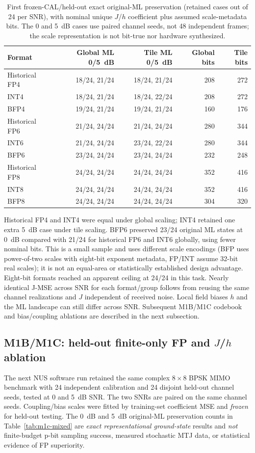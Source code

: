 \documentclass[11pt,a4paper]{article}
\begin{document}
\begin{table}[htbp]
\centering\small
\begin{tabular}{@{}lrrrr@{}}\toprule
Format & Global ML 0/5~dB & Tile ML 0/5~dB & Global bits & Tile bits\\\midrule
Historical FP4 & 18/24, 21/24 & 18/24, 21/24 & 208 & 272\\
INT4 & 18/24, 21/24 & 18/24, 22/24 & 208 & 272\\
BFP4 & 19/24, 21/24 & 19/24, 21/24 & 160 & 176\\
Historical FP6 & 21/24, 24/24 & 21/24, 24/24 & 280 & 344\\
INT6 & 21/24, 24/24 & 23/24, 22/24 & 280 & 344\\
BFP6 & 23/24, 24/24 & 23/24, 24/24 & 232 & 248\\
Historical FP8 & 24/24, 24/24 & 24/24, 24/24 & 352 & 416\\
INT8 & 24/24, 24/24 & 24/24, 24/24 & 352 & 416\\
BFP8 & 24/24, 24/24 & 24/24, 24/24 & 304 & 320\\\bottomrule
\end{tabular}
\caption{First frozen-CAL/held-out exact original-ML preservation
(retained cases out of 24 per SNR), with nominal unique $J$/$h$
coefficient plus assumed scale-metadata bits. The 0 and 5~dB
cases use paired channel seeds, not 48 independent frames; the
scale representation is not bit-true nor hardware synthesized.}
\label{tab:m1b-heldout}
\end{table}

Historical FP4 and INT4 were equal under global scaling; INT4
retained one extra 5~dB case under tile scaling. BFP6 preserved
23/24 original ML states at 0~dB compared with 21/24 for
historical FP6 and INT6 globally, using fewer nominal bits.
This is a small sample and uses different scale encodings
(BFP uses power-of-two scales with eight-bit exponent metadata,
FP/INT assume 32-bit real scales); it is not an equal-area or
statistically established design advantage. Eight-bit formats
reached an apparent ceiling at 24/24 in this task.
Nearly identical J-MSE across SNR for each format/group follows
from reusing the same channel realizations and $J$ independent
of received noise. Local field biases $h$ and the ML landscape
can still differ across SNR. Subsequent M1B/M1C codebook
and bias/coupling ablations are described in the next subsection.
\subsection{M1B/M1C: held-out finite-only FP and $J$/$h$ ablation}
The next NUS software run retained the same complex $8\times8$
BPSK MIMO benchmark with 24 independent calibration and 24
disjoint held-out channel seeds, tested at 0 and 5~dB SNR.
The two SNRs are paired on the same channel seeds. Coupling/bias
scales were fitted by training-set coefficient MSE and \emph{frozen}
for held-out testing. The 0~dB and 5~dB original-ML preservation
counts in Table~\ref{tab:m1c-mixed} are \emph{exact representational
ground-state} results and \emph{not} finite-budget p-bit sampling
success, measured stochastic MTJ data, or statistical evidence
of FP superiority.
\end{document}
